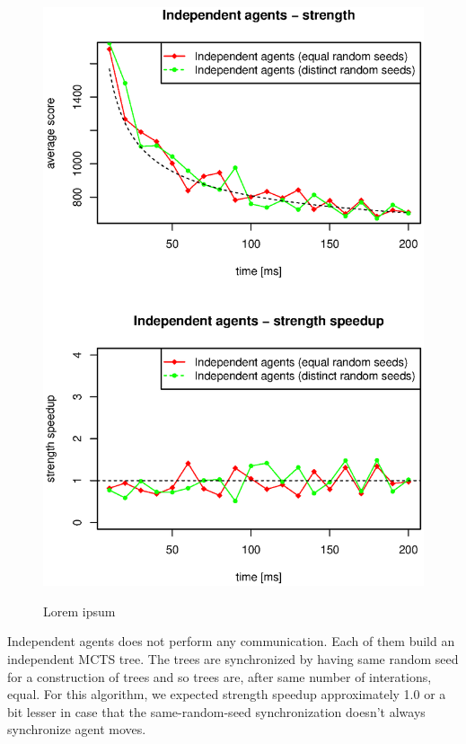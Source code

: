 \begin{figure}
\begin{center}
\includegraphics{img/dummy-ghosts-strength.eps}
\end{center}
\caption{\footnotesize Lorem ipsum}{\footnotesize }
\label{fig_independent_agents_strength}
\end{figure}

Independent agents does not perform any communication. Each of them build an independent MCTS
tree. The trees are synchronized by having same random seed for a construction of trees and so
trees are, after same number of interations, equal. For this algorithm, we expected strength
speedup approximately 1.0 or a bit lesser in case that the same-random-seed synchronization
doesn't always synchronize agent moves.

